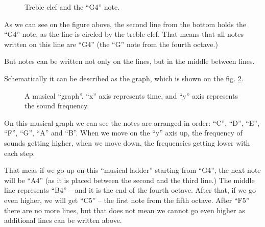 \documentclass[../sparc.tex]{subfiles}
\begin{document}
\begin{figure}[ht]
  \centering
  \label{fig:lilypond-clef-example}
  \caption{Treble clef and the ``G4'' note.}
\end{figure}

As we can see on the figure above, the second line from the bottom holds the
``G4'' note, as the line is circled by the treble clef.  That means that all
notes written on this line are ``G4'' (the ``G'' note from the fourth octave.)

But notes can be written not only on the lines, but in the middle between lines.

Schematically it can be described as the graph, which is shown on the
fig. \ref{fig:lilypond-music-graph-1}.

\begin{figure}[ht]
  \centering
  \label{fig:lilypond-music-graph-1}
  \caption{A musical ``graph''.  ``x'' axis represents time, and ``y'' axis
    represents the sound frequency.}
\end{figure}

On this musical graph we can see the notes are arranged in order: ``C'', ``D'',
``E'', ``F'', ``G'', ``A'' and ``B''.  When we move on the ``y'' axis up, the
frequency of sounds getting higher, when we move down, the frequencies getting
lower with each step.

That meas if we go up on this ``musical ladder'' starting from ``G4'', the next
note will be ``A4'' (as it is placed between the second and the third line.)
The middle line represents ``B4'' -- and it is the end of the fourth octave.
After that, if we go even higher, we will get ``C5'' -- the first note from the
fifth octave.  After ``F5'' there are no more lines, but that does not mean we
cannot go even higher as additional lines can be written above.
\end{document}
